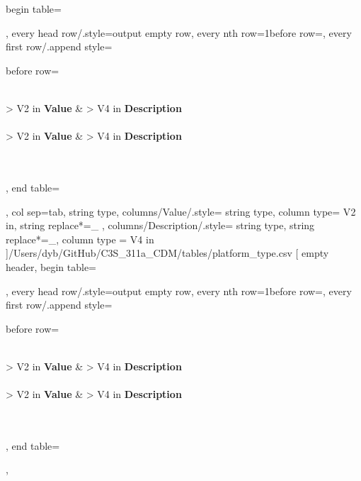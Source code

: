 \documentclass[a4paper]{article}
\begin{document}
    begin table=\begin{longtable},
    every head row/.style={output empty row},
    every nth row={1}{before row=\hline},
    every first row/.append style={
        before row={%
            \caption{Platform type}
            \label{tab:DataTable}\\
            \hline\hline {} { > {\centering}V{2 in}} { \textbf{Value}} &  { > {\centering} V{4 in} } {\textbf{Description}} \\ \hline\hline \endfirsthead
             \\
            \hline\hline {} { > {\centering}V{2 in} } { \textbf{Value}} &  { > {\centering} V{4 in} } {\textbf{Description}} \\ \hline\hline \endhead
             \\
            \endfoot
            \hline
             \\ 
            \endlastfoot
        }
    },
    end table=\end{longtable},
    col sep=tab,
    string type,
    columns/Value/.style={
            string type, 
            column type= V{2 in}, 
            string replace*={_}{}
        },
    columns/Description/.style={
            string type, 
            string replace*={_}{},
            column type = V{4 in}
        }
    ]{/Users/dyb/GitHub/C3S_311a_CDM/tables/platform_type.csv}
\pgfplotstabletypeset[
    empty header,
    begin table=\begin{longtable},
    every head row/.style={output empty row},
    every nth row={1}{before row=\hline},
    every first row/.append style={
        before row={%
            \caption{Processing code}
            \label{tab:DataTable}\\
            \hline\hline {} { > {\centering}V{2 in}} { \textbf{Value}} &  { > {\centering} V{4 in} } {\textbf{Description}} \\ \hline\hline \endfirsthead
             \\
            \hline\hline {} { > {\centering}V{2 in} } { \textbf{Value}} &  { > {\centering} V{4 in} } {\textbf{Description}} \\ \hline\hline \endhead
             \\
            \endfoot
            \hline
             \\ 
            \endlastfoot
        }
    },
    end table=\end{longtable},
\end{document}
